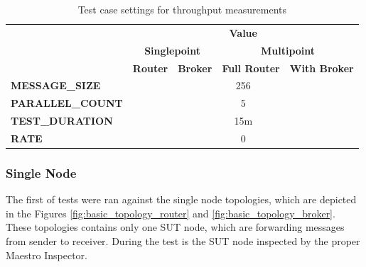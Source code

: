 \begingroup
\setlength{\tabcolsep}{10pt} %
\renewcommand{\arraystretch}{1.35} %
	\begin{table}[H]
	\centering
	\caption{Test case settings for throughput measurements}
	\label{tab:test_case_throughput}
	\begin{tabular}{|l|r|r|r|r|}
	\hline
	\rowcolor[HTML]{C5E3DF}
	\cellcolor[HTML]{C5E3DF}                                         & \multicolumn{4}{c|}{\cellcolor[HTML]{C5E3DF}\textbf{Value}}                                                                          \\ \cline{2-5}
	\rowcolor[HTML]{C5E3DF}
	\cellcolor[HTML]{C5E3DF}                                         & \multicolumn{2}{c|}{\cellcolor[HTML]{C5E3DF}\textbf{Singlepoint}} & \multicolumn{2}{c|}{\cellcolor[HTML]{C5E3DF}\textbf{Multipoint}} \\ \cline{2-5}
	\rowcolor[HTML]{C5E3DF}
	\multirow{-3}{*}{\cellcolor[HTML]{C5E3DF}\textbf{Test Property}} & \textbf{Router}                 & \textbf{Broker}                 & \textbf{Full Router}            & \textbf{With Broker}           \\ \hline
	\textbf{MESSAGE\_SIZE}                                           & \multicolumn{4}{c|}{256}                                                                                                             \\ \hline
	\textbf{PARALLEL\_COUNT}                                         & \multicolumn{4}{c|}{5}                                                                                                               \\ \hline
	\textbf{TEST\_DURATION}                                          & \multicolumn{4}{c|}{15m}                                                                                                             \\ \hline
	\textbf{RATE}                                                    & \multicolumn{4}{c|}{\cellcolor[HTML]{FFFFFF}0}                                                                                       \\ \hline
	\end{tabular}
	\end{table}
\endgroup

\subsubsection*{Single Node}
The first of tests were ran against the single node topologies, which are depicted in the Figures \ref{fig:basic_topology_router} and \ref{fig:basic_topology_broker}. These topologies contains only one SUT node, which are forwarding messages from sender to receiver. During the test is the SUT node inspected by the proper Maestro Inspector.


